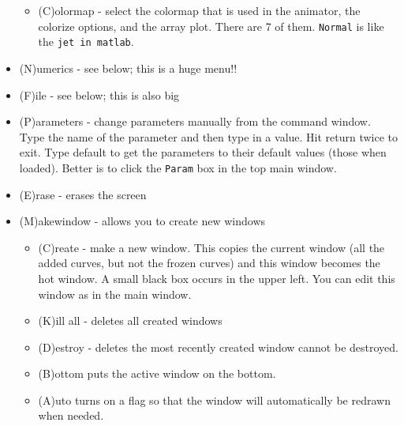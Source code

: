 \documentclass{article}
\begin{document}
\begin{itemize}
\begin{itemize}
\item (C)olormap - select the colormap that is used in the animator, the colorize options, and the array plot. There are 7 of them. {\tt Normal} is like the {\tt jet in matlab}. 
\end{itemize}
\item (N)umerics - see below; this is a huge menu!!
\item (F)ile - see below; this is also big
\item (P)arameters - change parameters manually from the command window. Type the name of the parameter and then type in a value. Hit return twice to exit. Type default to get the parameters to their default values (those when loaded). Better is to click the {\tt Param} box in the top main window. 
\item (E)rase - erases the screen
\item (M)akewindow - allows you to create new windows
\begin{itemize}
\item (C)reate - make a new window. This copies the current window (all the added curves, but not the frozen curves) and this window becomes the hot window. A small black box occurs in the upper left. You can edit this window as in the main window. 
\item (K)ill all - deletes all created windows
\item (D)estroy - deletes the most recently created window
 cannot be destroyed.  
\item (B)ottom puts the active window on the bottom. 
\item (A)uto turns on a flag so that the window will automatically be
redrawn when needed.


\end{itemize}
\end{itemize}
\end{document}
